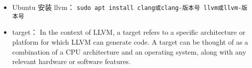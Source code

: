
\begin{issues}
\issueDraft
\end{issues}


\begin{itemize}
\item Ubuntu 安装 llvm： \verb|sudo apt install clang或clang-版本号 llvm或llvm-版本号|
\item target： In the context of LLVM, a target refers to a specific architecture or platform for which LLVM can generate code. A target can be thought of as a combination of a CPU architecture and an operating system, along with any relevant hardware or software features.
\end{itemize}

